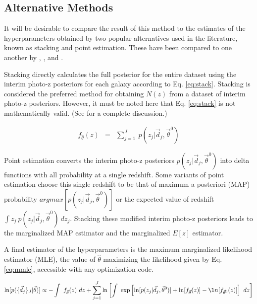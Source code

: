 \documentclass[preprint]{aastex}
\begin{document}
\clearpage
\subsection{Alternative Methods}
\label{sec:sheldon}

It will be desirable to compare the result of this method to the estimates of 
the hyperparameters obtained by two popular alternatives used in the 
literature, known as stacking and point estimation.   These have been compared 
to one another by \citet{Hildebrandt2012}, \citet{Benjamin2013}, and 
\citet{Asorey2016}.

Stacking directly calculates the full posterior for the entire dataset using 
the interim photo-z posteriors for each galaxy according to Eq. \ref{eq:stack}. 
 \citep{Lima2008}  Stacking is considered the preferred method for obtaining 
$N(z)$ from a dataset of interim photo-z posteriors.  \citep{Sheldon2012, 
Kelly2014, Benjamin2013, Bonnett2015a, Viironen2015, Asorey2016}  However, it 
must be noted here that Eq. \ref{eq:stack} is not mathematically valid.  (See 
\citet{Hogg2012} for a complete discussion.)  

\begin{eqnarray}
\label{eq:stack}
f_{\hat{\theta}}(z) &=& \sum_{j=1}^{J}\ p(z_{j}|\vec{d}_{j},\vec{\theta}^{0})
\end{eqnarray}

Point estimation converts the interim photo-z posteriors 
$p(z_{j}|\vec{d}_{j},\vec{\theta}^{0})$ into delta functions with all 
probability at a single redshift.  Some variants of point estimation choose 
this single redshift to be that of maximum a posteriori (MAP) probability 
$argmax[p(z_{j}|\vec{d}_{j},\vec{\theta}^{0})]$ or the expected value of 
redshift $\int z_{j}\ p(z_{j}|\vec{d}_{j},\vec{\theta}^{0})\ dz_{j}$.  Stacking 
these modified interim photo-z posteriors leads to the marginalized MAP 
estimator and the marginalized $E[z]$ estimator.

A final estimator of the hyperparameters is the maximum marginalized likelihood 
estimator (MLE), the value of $\hat{\theta}$ maximizing the likelihood given by 
Eq. \ref{eq:mmle}, accessible with any optimization code.

\begin{eqnarray}
\label{eq:mmle}
\ln[p(\{\vec{d}_{j}\}_{J}|\vec{\theta})] \propto -\int\ f_{\vec{\theta}}(z)\ 
dz+\sum_{j=1}^{J}\ln\left[\int\ 
\exp\left[\ln[p(z_{j}|\vec{d}_{j},\vec{\theta}^{0})]+\ln[f_{\vec{\theta}}(z)]-\l
n[f_{\vec{\theta}^{0}}(z)]\right]\ dz\right]
\end{eqnarray}
\end{document}
